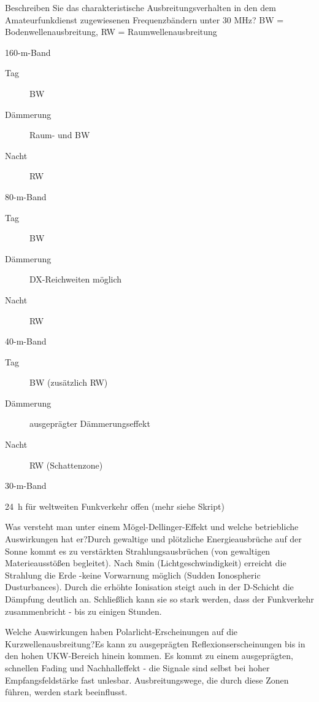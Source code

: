 \documentclass[avery5371,grid,frame,a4paper]{flashcards}
\newcommand{\card}[3]{
  \begin{flashcard}[{\chap} -- #1]{#2}#3\end{flashcard}
}
\begin{document}
\card{26}{Beschreiben Sie das charakteristische Ausbreitungsverhalten in den dem Amateurfunkdienst zugewiesenen Frequenzbändern unter 30 MHz?}{
  \footnotesize
  BW = Bodenwellenausbreitung, RW = Raumwellenausbreitung
  \begin{minipage}{0.5\textwidth}
    \centerline{160-m-Band}
      \begin{description}
        \item[Tag] BW
        \item[Dämmerung] Raum- und BW
        \item[Nacht] RW
      \end{description}

    \centerline{80-m-Band}
      \begin{description}
        \item[Tag] BW
        \item[Dämmerung] DX-Reichweiten möglich
        \item[Nacht] RW
      \end{description}
  \end{minipage}
  \begin{minipage}{0.48\textwidth}
    \centerline{40-m-Band}
      \begin{description}
        \item[Tag] BW (zusätzlich RW)
        \item[Dämmerung] ausgeprägter Dämmerungseffekt
        \item[Nacht] RW (Schattenzone)
      \end{description}

    \centerline{30-m-Band}
    24~h für weltweiten Funkverkehr offen (mehr siehe Skript)
  \end{minipage}
}
\card{27}{Was versteht man unter einem Mögel-Dellinger-Effekt und welche betriebliche Auswirkungen hat er?}{Durch gewaltige und plötzliche Energieausbrüche auf der Sonne kommt es zu verstärkten Strahlungsausbrüchen (von gewaltigen Materieausstößen begleitet). Nach 8min (Lichtgeschwindigkeit) erreicht die Strahlung die Erde -keine Vorwarnung möglich (Sudden Ionospheric Dusturbances). Durch die erhöhte Ionisation steigt auch in der D-Schicht die Dämpfung deutlich an. Schließlich kann sie so stark werden, dass der Funkverkehr zusammenbricht - bis zu einigen Stunden.}
\card{28}{Welche Auswirkungen haben Polarlicht-Erscheinungen auf die Kurzwellenausbreitung?}{Es kann zu ausgeprägten Reflexionserscheinungen bis in den hohen UKW-Bereich hinein kommen. Es kommt zu einem ausgeprägten, schnellen Fading und Nachhalleffekt - die Signale sind selbst bei hoher Empfangsfeldstärke fast unlesbar. Ausbreitungswege, die durch diese Zonen führen, werden stark beeinflusst.}
\end{document}
